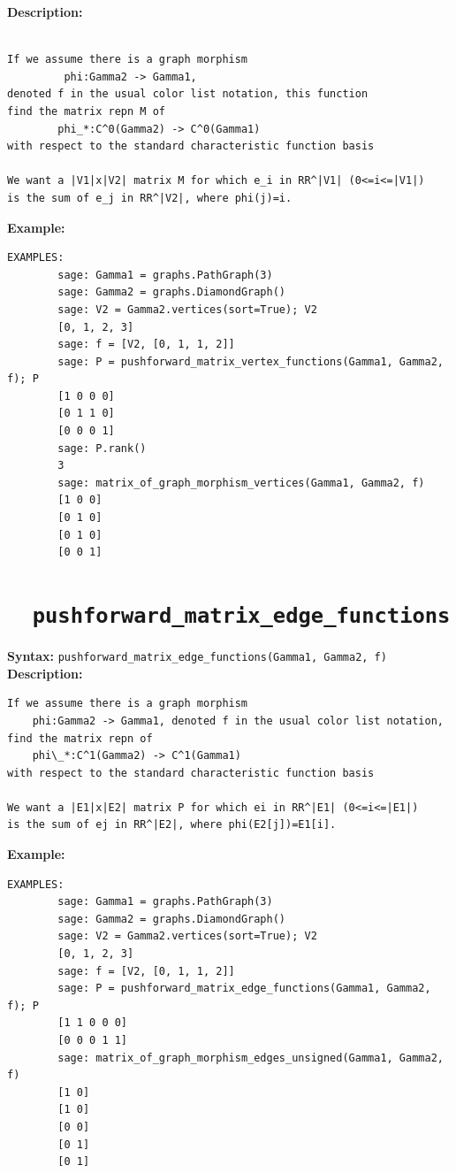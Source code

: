 \documentclass{article}
\begin{document}
\textbf{Description:}
\begin{verbatim}

If we assume there is a graph morphism
         phi:Gamma2 -> Gamma1,
denoted f in the usual color list notation, this function
find the matrix repn M of
        phi_*:C^0(Gamma2) -> C^0(Gamma1)
with respect to the standard characteristic function basis

We want a |V1|x|V2| matrix M for which e_i in RR^|V1| (0<=i<=|V1|)
is the sum of e_j in RR^|V2|, where phi(j)=i.
\end{verbatim}

\textbf{Example:}
\begin{verbatim}
EXAMPLES:
        sage: Gamma1 = graphs.PathGraph(3)
        sage: Gamma2 = graphs.DiamondGraph()
        sage: V2 = Gamma2.vertices(sort=True); V2
        [0, 1, 2, 3]
        sage: f = [V2, [0, 1, 1, 2]]
        sage: P = pushforward_matrix_vertex_functions(Gamma1, Gamma2, f); P
        [1 0 0 0]
        [0 1 1 0]
        [0 0 0 1]
        sage: P.rank() 
        3
        sage: matrix_of_graph_morphism_vertices(Gamma1, Gamma2, f)
        [1 0 0]
        [0 1 0]
        [0 1 0]
        [0 0 1]
\end{verbatim}

\section{\tt \ \ pushforward\_matrix\_edge\_functions}

\textbf{Syntax:} \verb}pushforward_matrix_edge_functions(Gamma1, Gamma2, f)}\\

\textbf{Description:}
\begin{verbatim}
If we assume there is a graph morphism
    phi:Gamma2 -> Gamma1, denoted f in the usual color list notation,
find the matrix repn of
    phi\_*:C^1(Gamma2) -> C^1(Gamma1)
with respect to the standard characteristic function basis

We want a |E1|x|E2| matrix P for which ei in RR^|E1| (0<=i<=|E1|)
is the sum of ej in RR^|E2|, where phi(E2[j])=E1[i].
\end{verbatim}

\textbf{Example:}
\begin{verbatim}
EXAMPLES:
        sage: Gamma1 = graphs.PathGraph(3)
        sage: Gamma2 = graphs.DiamondGraph()
        sage: V2 = Gamma2.vertices(sort=True); V2
        [0, 1, 2, 3]
        sage: f = [V2, [0, 1, 1, 2]]
        sage: P = pushforward_matrix_edge_functions(Gamma1, Gamma2, f); P
        [1 1 0 0 0]
        [0 0 0 1 1]
        sage: matrix_of_graph_morphism_edges_unsigned(Gamma1, Gamma2, f)
        [1 0]
        [1 0]
        [0 0]
        [0 1]
        [0 1]
\end{verbatim}
\end{document}
